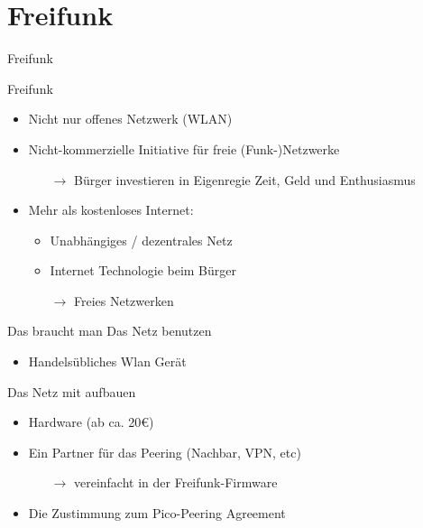 \section{Freifunk}
\begin{frame}{}
    \begin{center}
        Freifunk
     \end{center}
\end{frame}

\begin{frame}{Freifunk}
    \begin{itemize}
        \item Nicht nur offenes Netzwerk (WLAN)
        \item Nicht-kommerzielle Initiative für freie (Funk-)Netzwerke
        \begin{itemize}
            \item[$\rightarrow$] Bürger investieren in Eigenregie Zeit, Geld und Enthusiasmus
        \end{itemize}
    \end{itemize}
        \vfill
    \begin{itemize}
        \item Mehr als \glqq{}kostenloses Internet\grqq:
        \begin{itemize}
            \item Unabhängiges / dezentrales Netz
            \item Internet Technologie beim Bürger
            \item[$\rightarrow$] Freies Netzwerken
        \end{itemize}
    \end{itemize}
\end{frame}

\begin{frame}{Das braucht man}
    Das Netz benutzen
    \begin{itemize}
        \item Handelsübliches Wlan Gerät
    \end{itemize}

    \vfill

    Das Netz mit aufbauen
    \begin{itemize}
        \item Hardware (ab ca. 20€)
        \item Ein Partner für das Peering (Nachbar, VPN, etc)
        \begin{itemize}
            \item[$\rightarrow$] vereinfacht in der Freifunk-Firmware
        \end{itemize}
        \item Die Zustimmung zum \glqq{}Pico-Peering Agreement\grqq
    \end{itemize}
\end{frame}


